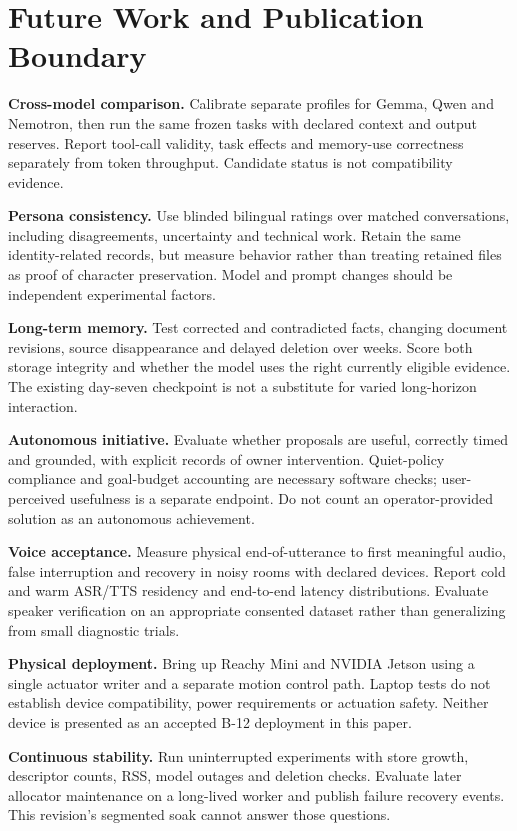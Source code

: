 \documentclass[11pt,a4paper]{article}
\begin{document}
\section{Future Work and Publication Boundary}
\textbf{Cross-model comparison.} Calibrate separate profiles for Gemma, Qwen and Nemotron, then run the same frozen tasks with declared context and output reserves. Report tool-call validity, task effects and memory-use correctness separately from token throughput. Candidate status is not compatibility evidence.

\textbf{Persona consistency.} Use blinded bilingual ratings over matched conversations, including disagreements, uncertainty and technical work. Retain the same identity-related records, but measure behavior rather than treating retained files as proof of character preservation. Model and prompt changes should be independent experimental factors.

\textbf{Long-term memory.} Test corrected and contradicted facts, changing document revisions, source disappearance and delayed deletion over weeks. Score both storage integrity and whether the model uses the right currently eligible evidence. The existing day-seven checkpoint is not a substitute for varied long-horizon interaction.

\textbf{Autonomous initiative.} Evaluate whether proposals are useful, correctly timed and grounded, with explicit records of owner intervention. Quiet-policy compliance and goal-budget accounting are necessary software checks; user-perceived usefulness is a separate endpoint. Do not count an operator-provided solution as an autonomous achievement.

\textbf{Voice acceptance.} Measure physical end-of-utterance to first meaningful audio, false interruption and recovery in noisy rooms with declared devices. Report cold and warm ASR/TTS residency and end-to-end latency distributions. Evaluate speaker verification on an appropriate consented dataset rather than generalizing from small diagnostic trials.

\textbf{Physical deployment.} Bring up Reachy Mini and NVIDIA Jetson using a single actuator writer and a separate motion control path. Laptop tests do not establish device compatibility, power requirements or actuation safety. Neither device is presented as an accepted B-12 deployment in this paper.

\textbf{Continuous stability.} Run uninterrupted experiments with store growth, descriptor counts, RSS, model outages and deletion checks. Evaluate later allocator maintenance on a long-lived worker and publish failure recovery events. This revision's segmented soak cannot answer those questions.
\end{document}
